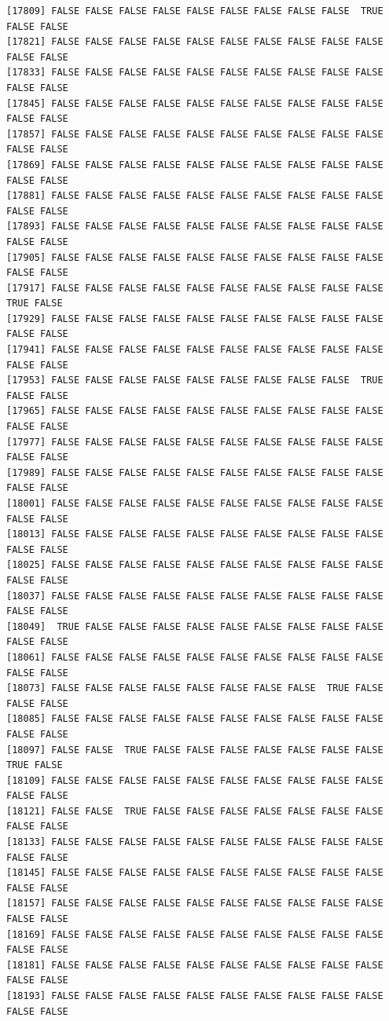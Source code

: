 \documentclass[
  a4paper,
  DIV=11,
  numbers=noendperiod]{scrartcl}
\begin{document}
\begin{verbatim}
[17809] FALSE FALSE FALSE FALSE FALSE FALSE FALSE FALSE FALSE  TRUE FALSE FALSE
[17821] FALSE FALSE FALSE FALSE FALSE FALSE FALSE FALSE FALSE FALSE FALSE FALSE
[17833] FALSE FALSE FALSE FALSE FALSE FALSE FALSE FALSE FALSE FALSE FALSE FALSE
[17845] FALSE FALSE FALSE FALSE FALSE FALSE FALSE FALSE FALSE FALSE FALSE FALSE
[17857] FALSE FALSE FALSE FALSE FALSE FALSE FALSE FALSE FALSE FALSE FALSE FALSE
[17869] FALSE FALSE FALSE FALSE FALSE FALSE FALSE FALSE FALSE FALSE FALSE FALSE
[17881] FALSE FALSE FALSE FALSE FALSE FALSE FALSE FALSE FALSE FALSE FALSE FALSE
[17893] FALSE FALSE FALSE FALSE FALSE FALSE FALSE FALSE FALSE FALSE FALSE FALSE
[17905] FALSE FALSE FALSE FALSE FALSE FALSE FALSE FALSE FALSE FALSE FALSE FALSE
[17917] FALSE FALSE FALSE FALSE FALSE FALSE FALSE FALSE FALSE FALSE  TRUE FALSE
[17929] FALSE FALSE FALSE FALSE FALSE FALSE FALSE FALSE FALSE FALSE FALSE FALSE
[17941] FALSE FALSE FALSE FALSE FALSE FALSE FALSE FALSE FALSE FALSE FALSE FALSE
[17953] FALSE FALSE FALSE FALSE FALSE FALSE FALSE FALSE FALSE  TRUE FALSE FALSE
[17965] FALSE FALSE FALSE FALSE FALSE FALSE FALSE FALSE FALSE FALSE FALSE FALSE
[17977] FALSE FALSE FALSE FALSE FALSE FALSE FALSE FALSE FALSE FALSE FALSE FALSE
[17989] FALSE FALSE FALSE FALSE FALSE FALSE FALSE FALSE FALSE FALSE FALSE FALSE
[18001] FALSE FALSE FALSE FALSE FALSE FALSE FALSE FALSE FALSE FALSE FALSE FALSE
[18013] FALSE FALSE FALSE FALSE FALSE FALSE FALSE FALSE FALSE FALSE FALSE FALSE
[18025] FALSE FALSE FALSE FALSE FALSE FALSE FALSE FALSE FALSE FALSE FALSE FALSE
[18037] FALSE FALSE FALSE FALSE FALSE FALSE FALSE FALSE FALSE FALSE FALSE FALSE
[18049]  TRUE FALSE FALSE FALSE FALSE FALSE FALSE FALSE FALSE FALSE FALSE FALSE
[18061] FALSE FALSE FALSE FALSE FALSE FALSE FALSE FALSE FALSE FALSE FALSE FALSE
[18073] FALSE FALSE FALSE FALSE FALSE FALSE FALSE FALSE  TRUE FALSE FALSE FALSE
[18085] FALSE FALSE FALSE FALSE FALSE FALSE FALSE FALSE FALSE FALSE FALSE FALSE
[18097] FALSE FALSE  TRUE FALSE FALSE FALSE FALSE FALSE FALSE FALSE  TRUE FALSE
[18109] FALSE FALSE FALSE FALSE FALSE FALSE FALSE FALSE FALSE FALSE FALSE FALSE
[18121] FALSE FALSE  TRUE FALSE FALSE FALSE FALSE FALSE FALSE FALSE FALSE FALSE
[18133] FALSE FALSE FALSE FALSE FALSE FALSE FALSE FALSE FALSE FALSE FALSE FALSE
[18145] FALSE FALSE FALSE FALSE FALSE FALSE FALSE FALSE FALSE FALSE FALSE FALSE
[18157] FALSE FALSE FALSE FALSE FALSE FALSE FALSE FALSE FALSE FALSE FALSE FALSE
[18169] FALSE FALSE FALSE FALSE FALSE FALSE FALSE FALSE FALSE FALSE FALSE FALSE
[18181] FALSE FALSE FALSE FALSE FALSE FALSE FALSE FALSE FALSE FALSE FALSE FALSE
[18193] FALSE FALSE FALSE FALSE FALSE FALSE FALSE FALSE FALSE FALSE FALSE FALSE

\end{verbatim}
\end{document}
